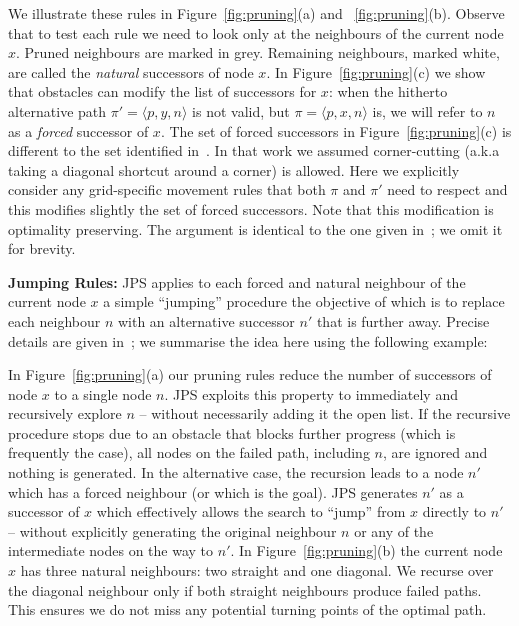 We illustrate these rules in Figure~\ref{fig:pruning}(a) and ~\ref{fig:pruning}(b).
Observe that to test each rule we need to look only at
the neighbours of the current node $x$. 
Pruned neighbours are marked in grey. Remaining neighbours, marked
white, are called the \emph{natural} successors of node $x$.  
In Figure~\ref{fig:pruning}(c) we show
that obstacles can modify the list of successors for $x$:
when the hitherto alternative path $\pi' = \langle p, y, n \rangle$ is
not valid, but $\pi = \langle p, x, n \rangle$ is, we will refer to $n$ as
a \emph{forced} successor of $x$.
The set of forced successors in Figure~\ref{fig:pruning}(c) is different
to the set identified in~\cite{harabor11b}. 
In that work we assumed corner-cutting (a.k.a taking a diagonal shortcut around a corner) is allowed.
Here we explicitly consider any grid-specific movement rules that both $\pi$ 
and $\pi'$ need to respect and this modifies slightly the set of forced successors.
Note that this modification is optimality preserving.
The argument is identical to the one given in~\cite{harabor11b}; we omit it 
for brevity.


\textbf{Jumping Rules:}
JPS applies to each forced and natural neighbour of the current node $x$ a simple
``jumping'' procedure the objective of which is to replace each neighbour $n$ with an 
alternative successor $n'$ that is further away. Precise details are given
in~\cite{harabor11b}; we summarise the idea here using the following example:

\begin{example}
In Figure~\ref{fig:pruning}(a) our pruning rules reduce the number
of successors of node $x$ to a single node $n$.
JPS exploits this property to immediately and recursively
explore $n$ -- without necessarily adding it the open list.
If the recursive procedure stops due to an obstacle that blocks further progress
(which is frequently the case), all nodes on the failed path, including $n$, are ignored
and nothing is generated.
In the alternative case, the recursion leads to a node $n'$ which has a forced
neighbour (or which is the goal). JPS generates $n'$ as a successor of $x$ which
effectively allows the search to ``jump'' from $x$ directly to $n'$ -- without explicitly 
generating the original neighbour $n$ or any of the intermediate nodes on the way to $n'$.
In Figure~\ref{fig:pruning}(b) the current node $x$ has three natural neighbours: two straight and one diagonal.
We recurse over the diagonal neighbour only if both straight neighbours produce
failed paths. This ensures we do not miss any potential turning points of the optimal path.
\end{example}

